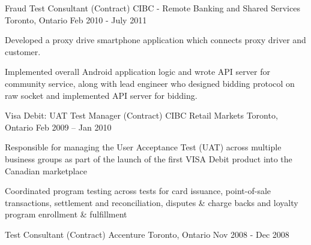\begin{cventries}
  \cventry
    {Fraud Test Consultant (Contract)} %
    {CIBC - Remote Banking and Shared Services} %
    {Toronto, Ontario} %
    {Feb 2010 - July 2011} %
    {
      \begin{cvitems} %
        \item {Developed a proxy drive smartphone application which connects proxy driver and customer.}
        \item {Implemented overall Android application logic and wrote API server for community service, along with lead engineer who designed bidding protocol on raw socket and implemented API server for bidding.}
      \end{cvitems}
    }
  \cventry
    {Visa Debit: UAT Test Manager (Contract)} %
    {CIBC Retail Markets} %
    {Toronto, Ontario} %
    {Feb 2009 – Jan 2010} %
    {
      \begin{cvitems} %
        \item {Responsible for managing the User Acceptance Test (UAT) across multiple business groups as part of the launch of the first VISA Debit product into the Canadian marketplace}
        \item {Coordinated program testing across tests for card issuance, point-of-sale transactions, settlement and reconciliation, disputes \& charge backs and loyalty program enrollment \& fulfillment}
      \end{cvitems}
    }

  \cventry
    {Test Consultant (Contract)} %
    {Accenture} %
    {Toronto, Ontario} %
    {Nov 2008 - Dec 2008} %
    {
    }


\end{cventries}

